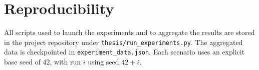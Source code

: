 \section{Reproducibility}

All scripts used to launch the experiments and to aggregate the results are stored in the project repository under \texttt{thesis/run\_experiments.py}. The aggregated data is checkpointed in \texttt{experiment\_data.json}. Each scenario uses an explicit base seed of 42, with run $i$ using seed $42 + i$.

